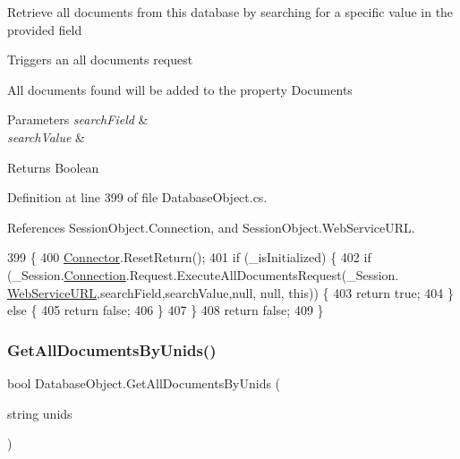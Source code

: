 Retrieve all documents from this database by searching for a specific value in the provided field 

Triggers an all documents request

All documents found will be added to the property \textquotesingle{}Documents\textquotesingle{}


\begin{DoxyParams}{Parameters}
{\em search\+Field} & \\
\hline
{\em search\+Value} & \\
\hline
\end{DoxyParams}
\begin{DoxyReturn}{Returns}
Boolean
\end{DoxyReturn}


Definition at line 399 of file Database\+Object.\+cs.



References Session\+Object.\+Connection, and Session\+Object.\+Web\+Service\+U\+RL.


\begin{DoxyCode}
399                                                                              \{
400         \hyperlink{class_connector}{Connector}.ResetReturn();
401         \textcolor{keywordflow}{if} (\_isInitialized) \{
402             \textcolor{keywordflow}{if} (\_Session.\hyperlink{class_session_object_a014bdbf705a753540e19bfb53030c55c}{Connection}.Request.ExecuteAllDocumentsRequest(\_Session.
      \hyperlink{class_session_object_a697c071c812fbf7ad1166b896fb44c16}{WebServiceURL},searchField,searchValue,null, null, \textcolor{keyword}{this})) \{
403                 \textcolor{keywordflow}{return} \textcolor{keyword}{true};
404             \} \textcolor{keywordflow}{else} \{
405                 \textcolor{keywordflow}{return} \textcolor{keyword}{false};
406             \}
407         \}
408         \textcolor{keywordflow}{return} \textcolor{keyword}{false};
409     \}
\end{DoxyCode}
\mbox{\label{class_database_object_a4d8a7d73614f53a04fe8eb79bef2f614}} 
\subsubsection{\texorpdfstring{Get\+All\+Documents\+By\+Unids()}{GetAllDocumentsByUnids()}\hspace{0.1cm}{\footnotesize\ttfamily [1/2]}}
{\footnotesize\ttfamily bool Database\+Object.\+Get\+All\+Documents\+By\+Unids (\begin{DoxyParamCaption}\item[{string}]{unids }\end{DoxyParamCaption})}



